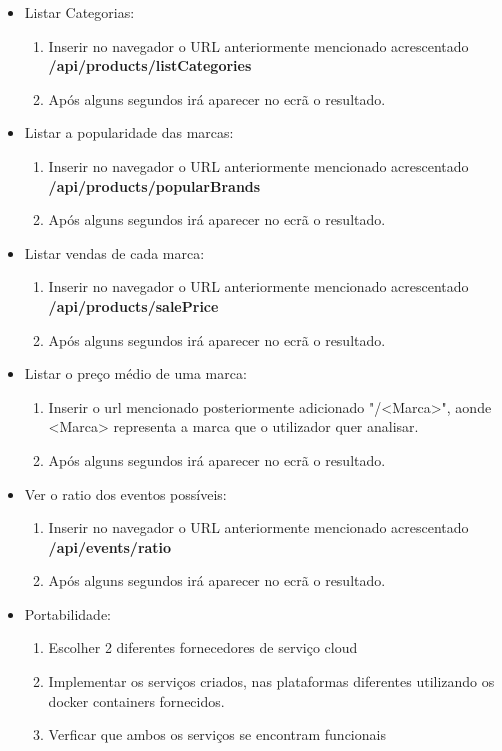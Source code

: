 \documentclass[11pt,a4paper]{article}
\begin{document}
\begin{itemize}
	\item Listar Categorias:
	\begin{enumerate}
		\item Inserir no navegador o URL anteriormente mencionado acrescentado \textbf{/api/products/listCategories}
		\item Após alguns segundos irá aparecer no ecrã o resultado.
	\end{enumerate}
	\item Listar a popularidade das marcas:
	\begin{enumerate}
		\item Inserir no navegador o URL anteriormente mencionado acrescentado \textbf{/api/products/popularBrands}
		\item Após alguns segundos irá aparecer no ecrã o resultado.
	\end{enumerate}
	\item Listar vendas de cada marca:
	\begin{enumerate}
		\item Inserir no navegador o URL anteriormente mencionado acrescentado \textbf{/api/products/salePrice}
		\item Após alguns segundos irá aparecer no ecrã o resultado.
	\end{enumerate}
	\item Listar o preço médio de uma marca:
	\begin{enumerate}
		\item Inserir o url mencionado posteriormente adicionado "/<Marca>", aonde <Marca> representa a marca que o utilizador quer analisar.
		\item Após alguns segundos irá aparecer no ecrã o resultado.
	\end{enumerate}
	\item Ver o ratio dos eventos possíveis:
	\begin{enumerate}
		\item Inserir no navegador o URL anteriormente mencionado acrescentado \textbf{/api/events/ratio}
		\item Após alguns segundos irá aparecer no ecrã o resultado.
	\end{enumerate}
	\item Portabilidade:
	\begin{enumerate}
		\item Escolher 2 diferentes fornecedores de serviço cloud
		\item Implementar os serviços criados, nas plataformas diferentes utilizando os docker containers fornecidos.
		\item Verficar que ambos os serviços se encontram funcionais
	\end{enumerate}


\end{itemize}
\end{document}
